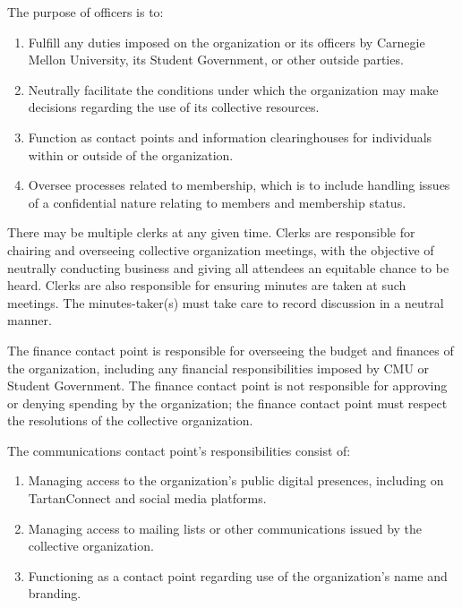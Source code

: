 \documentclass[11pt]{article}
\newcounter{h1}
\newcounter{h2}[h1]
\newcounter{h3}[h2]
\begin{document}


The purpose of officers is to:

\begin{enumerate}
  \item Fulfill any duties imposed on the organization or its officers by Carnegie Mellon University, its Student Government, or other outside parties.  
  \item Neutrally facilitate the conditions under which the organization may make decisions regarding the use of its collective resources.  
  \item Function as contact points and information clearinghouses for individuals within or outside of the organization.  
  \item Oversee processes related to membership, which is to include handling issues of a confidential nature relating to members and membership status.
\end{enumerate}



There may be multiple clerks at any given time. Clerks are responsible for chairing and overseeing collective organization meetings, with the objective of neutrally conducting business and giving all attendees an equitable chance to be heard. Clerks are also responsible for ensuring minutes are taken at such meetings. The minutes-taker(s) must take care to record discussion in a neutral manner.


The finance contact point is responsible for overseeing the budget and finances of the organization, including any financial responsibilities imposed by CMU or Student Government. The finance contact point is not responsible for approving or denying spending by the organization; the finance contact point must respect the resolutions of the collective organization.


The communications contact point's responsibilities consist of:

\begin{enumerate}
  \item Managing access to the organization's public digital presences, including on TartanConnect and social media platforms.  
  \item Managing access to mailing lists or other communications issued by the collective organization.  
  \item Functioning as a contact point regarding use of the organization's name and branding.
\end{enumerate}
\end{document}
